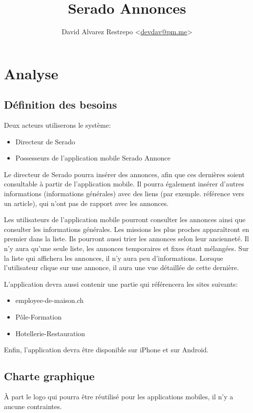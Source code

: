 \documentclass[french]{report}
\begin{document}
\title{Serado Annonces}
\author{David Alvarez Restrepo <\href{mailto:devdav@pm.me}{devdav@pm.me}>}
\maketitle

\chapter{Analyse}

\section{Définition des besoins}
Deux acteurs utiliserons le système:
\begin{itemize}
    \item Directeur de Serado
    \item Possesseurs de l'application mobile \og Serado Annonce\fg{}
\end{itemize}

Le directeur de Serado pourra insérer des annonces, afin que ces dernières
soient consultable à partir de l'application mobile. Il pourra également insérer
d'autres informations (informations générales) avec des liens (par exemple. référence vers un article), qui
n'ont pas de rapport avec les annonces.

Les utilisateurs de l'application mobile pourront consulter les annonces ainsi que
consulter les informations générales. Les missions les plus proches apparaîtront
en premier dans la liste. Ils pourront aussi trier les annonces selon leur
ancienneté. Il n'y aura qu'une seule liste, les annonces temporaires et fixes étant
mélangées. Sur la liste qui affichera les annonces, il n'y aura peu d'informations.
Lorsque l'utilisateur clique sur une annonce, il aura une vue détaillée de cette
dernière.

L'application devra aussi contenir une partie qui référencera les sites suivants:
\begin{itemize}
    \item employee-de-maison.ch
    \item Pôle-Formation
    \item Hotellerie-Restauration
\end{itemize}
\vspace{1em}
Enfin, l'application devra être disponible sur iPhone et sur Android.

\section{Charte graphique}
À part le logo qui pourra être réutilisé pour les applications mobiles, il n'y a
aucune contraintes.
\end{document}
